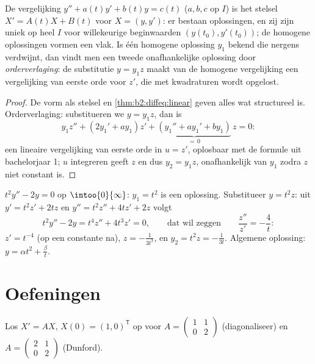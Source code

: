\begin{proposition}\label{prop:b2:diffeq:secondorder}
De vergelijking $y'' + a(t)y' + b(t)y = c(t)$ ($a, b, c$  op
$I$) is het stelsel $X' = A(t)X + B(t)$ voor $X = (y, y')$: er
bestaan oplossingen, en zij zijn uniek op heel $I$ voor
willekeurige beginwaarden $(y(t_0), y'(t_0))$; de homogene
oplossingen vormen een vlak. Is één homogene oplossing $y_1$ bekend
die nergens verdwijnt, dan vindt men een tweede onafhankelijke
oplossing door \emph{orderverlaging}: de substitutie $y = y_1 z$
maakt van de homogene vergelijking een vergelijking van eerste orde
voor $z'$, die met kwadraturen wordt opgelost.
\end{proposition}

\begin{proof}
De vorm als stelsel en \cref{thm:b2:diffeq:linear} geven alles wat
structureel is. Orderverlaging: substitueren we $y = y_1z$, dan is
\[
y_1 z'' + (2y_1' + a y_1)z' + \underbrace{(y_1'' + ay_1' +
by_1)}_{=\,0}\,z = 0 :
\]
een lineaire vergelijking van eerste orde in $u = z'$, oplosbaar
met de formule uit bachelorjaar 1; $u$ integreren geeft $z$ en dus
$y_2 = y_1 z$, onafhankelijk van $y_1$ zodra $z$ niet constant is.
\end{proof}

\begin{example}\label{ex:b2:diffeq:lowering}
$t^2y'' - 2y = 0$ op $\intoo{0}{\infty}$: $y_1 = t^2$ is een
oplossing. Substitueer $y = t^2z$: uit $y' = t^2z' + 2tz$ en $y'' =
t^2z'' + 4tz' + 2z$ volgt
\[
t^2y'' - 2y = t^4 z'' + 4t^3z' = 0,
\qquad\text{dat wil zeggen}\qquad \frac{z''}{z'} = -\frac4t :
\]
$z' = t^{-4}$ (op een constante na), $z = -\frac{1}{3t^3}$, en $y_2
= t^2z = -\frac{1}{3t}$. Algemene oplossing: $y = \alpha t^2 +
\frac{\beta}{t}$.
\end{example}

\section{Oefeningen}

\begin{exercise}[$\star$]\label{exo:b2:diffeq:1}
Los $X' = AX$, $X(0) = (1, 0)^{\mathsf T}$ op voor $A =
\begin{pmatrix} 1 & 1\\ 0 & 2\end{pmatrix}$ (diagonaliseer) en $A =
\begin{pmatrix} 2 & 1\\ 0 & 2 \end{pmatrix}$ (Dunford).
\end{exercise}

